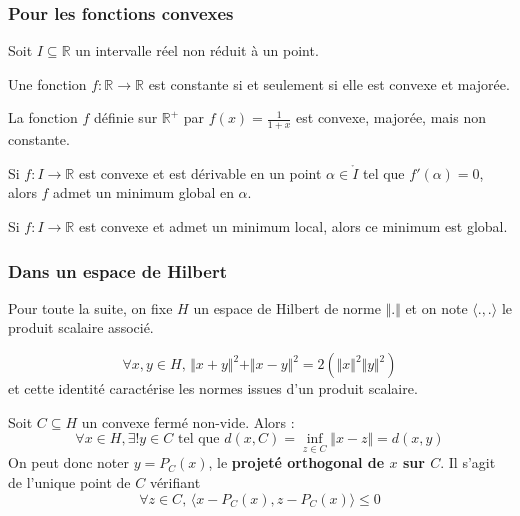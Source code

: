 	\subsubsection{Pour les fonctions convexes}
	
	
	Soit $I \subseteq \mathbb{R}$ un intervalle réel non réduit à un point.
	
	\begin{proposition}
		Une fonction $f : \mathbb{R} \rightarrow \mathbb{R}$ est constante si et seulement si elle est convexe et majorée.
	\end{proposition}
	
	\begin{cexample}
		La fonction $f$ définie sur $\mathbb{R}^+$ par $f(x) = \frac{1}{1+x}$ est convexe, majorée, mais non constante.
	\end{cexample}
	
	\begin{proposition}
		Si $f : I \rightarrow \mathbb{R}$ est convexe et est dérivable en un point $\alpha \in \mathring{I}$ tel que $f'(\alpha) = 0$, alors $f$ admet un minimum global en $\alpha$.
	\end{proposition}
	
	\begin{proposition}
		Si $f : I \rightarrow \mathbb{R}$ est convexe et admet un minimum local, alors ce minimum est global.
	\end{proposition}
	
	\subsubsection{Dans un espace de Hilbert}
	
	
	Pour toute la suite, on fixe $H$ un espace de Hilbert de norme $\Vert . \Vert$ et on note $\langle ., . \rangle$ le produit scalaire associé.
	
	\begin{lemma}
		\[ \forall x, y \in H, \, \Vert x + y \Vert^2 + \Vert x - y \Vert^2 = 2(\Vert x \Vert^2 \Vert y \Vert^2) \]
		et cette identité caractérise les normes issues d'un produit scalaire.
	\end{lemma}
	
	
	\begin{theorem}
		Soit $C \subseteq H$ un convexe fermé non-vide. Alors :
		\[ \forall x \in H, \exists! y \in C \text{ tel que } d(x, C) = \inf_{z \in C} \Vert x - z \Vert = d(x, y) \]
		On peut donc noter $y = P_C(x)$, le \textbf{projeté orthogonal de $x$ sur $C$}. Il s'agit de l'unique point de $C$ vérifiant
		\[ \forall z \in C, \, \langle x - P_C(x), z - P_C(x) \rangle \leq 0 \]
	\end{theorem}
	
